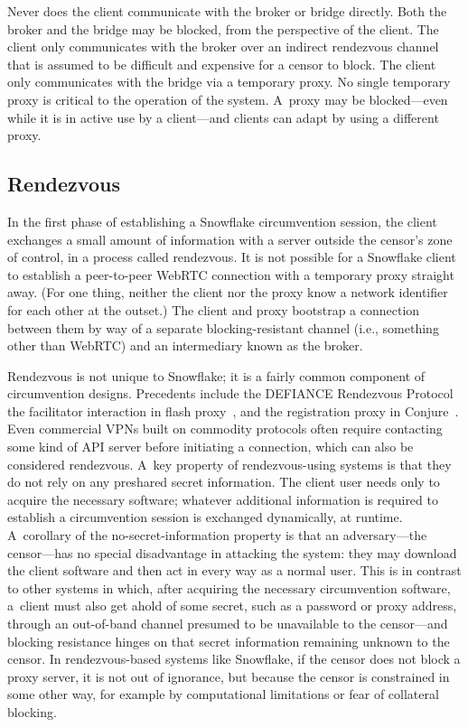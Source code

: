 \documentclass[letterpaper,twocolumn]{article}
\begin{document}
Never does the client communicate with the broker or bridge directly.
Both the broker and the bridge may be blocked,
from the perspective of the client.
The client only communicates with the broker over an indirect rendezvous channel
that is assumed to be difficult and expensive for a censor to block.
The client only communicates with the bridge via a temporary proxy.
No single temporary proxy is critical to the operation of the system.
A~proxy may be blocked---even while it is in active use by a client---and
clients can adapt by using a different proxy.

\subsection{Rendezvous}
\label{sec:rendezvous}

In the first phase of establishing a Snowflake circumvention session,
the client exchanges a small amount of information with a server
outside the censor's zone of control,
in a process called rendezvous.
It is not possible for a Snowflake client
to establish a peer-to-peer WebRTC connection
with a temporary proxy straight away.
(For one thing, neither the client nor the proxy
know a network identifier for each other at the outset.)
The client and proxy bootstrap a connection between them
by way of a separate blocking-resistant channel
(i.e., something other than WebRTC)
and an intermediary known as the broker.

Rendezvous is not unique to Snowflake;
it is a fairly common component of circumvention designs.
Precedents include the
DEFIANCE Rendezvous Protocol~\cite[\S 3]{Lincoln2012a}
the facilitator interaction in flash proxy~\cite[\S 3]{Fifield2012a},
and the registration proxy in Conjure~\cite[\S 4.1]{Frolov2019b}.
Even commercial VPNs built on commodity protocols
often require contacting some kind of API server
before initiating a connection, which can also be considered rendezvous.
A~key property of rendezvous-using systems
is that they do not rely on any preshared secret information.
The client user needs only to acquire the necessary software;
whatever additional information is required to establish a circumvention session
is exchanged dynamically, at runtime.
A~corollary of the no-secret-information property
is that an adversary---the censor---has
no special disadvantage in attacking the system:
they may download the client software
and then act in every way as a normal user.
This is in contrast to other systems in which,
after acquiring the necessary circumvention software,
a~client must also get ahold of some secret,
such as a password or proxy address,
through an out-of-band channel
presumed to be unavailable to the censor---and
blocking resistance hinges on that secret information
remaining unknown to the censor.
In rendezvous-based systems like Snowflake,
if the censor does not block a proxy server,
it is not out of ignorance,
but because the censor is constrained in some other way,
for example by computational limitations
or fear of collateral blocking.
\end{document}
